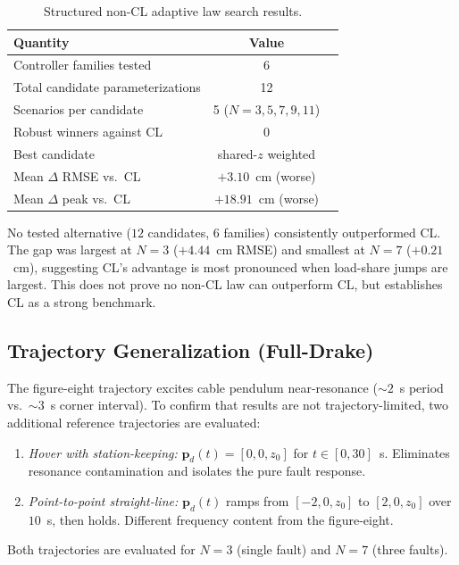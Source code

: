 \begin{table}[t]
\centering
\caption{Structured non-CL adaptive law search results.}
\label{tab:noncl_search}
\begin{tabular}{lcc}
\toprule
Quantity & Value \\
\midrule
Controller families tested       & 6 \\
Total candidate parameterizations & 12 \\
Scenarios per candidate          & 5 ($N = 3, 5, 7, 9, 11$) \\
Robust winners against CL        & 0 \\
\midrule
Best candidate                   & shared-$z$ weighted \\
Mean $\Delta$ RMSE vs.\ CL      & $+3.10$~cm (worse) \\
Mean $\Delta$ peak vs.\ CL      & $+18.91$~cm (worse) \\
\bottomrule
\end{tabular}
\end{table}

No tested alternative ($12$ candidates, $6$ families) consistently outperformed CL. The gap was largest at $N = 3$ ($+4.44$~cm RMSE) and smallest at $N = 7$ ($+0.21$~cm), suggesting CL's advantage is most pronounced when load-share jumps are largest. This does not prove no non-CL law can outperform CL, but establishes CL as a strong benchmark.

\subsection{Trajectory Generalization (Full-Drake)}
\label{supp:trajectory_generalization}

The figure-eight trajectory excites cable pendulum near-resonance (${\sim}2$~s period vs.\ ${\sim}3$~s corner interval). To confirm that results are not trajectory-limited, two additional reference trajectories are evaluated:
\begin{enumerate}[label=(\roman*),nosep]
  \item \emph{Hover with station-keeping:} $\bm{p}_d(t) = [0, 0, z_0]$ for $t \in [0, 30]$~s. Eliminates resonance contamination and isolates the pure fault response.
  \item \emph{Point-to-point straight-line:} $\bm{p}_d(t)$ ramps from $[-2, 0, z_0]$ to $[2, 0, z_0]$ over $10$~s, then holds. Different frequency content from the figure-eight.
\end{enumerate}
Both trajectories are evaluated for $N{=}3$ (single fault) and $N{=}7$ (three faults).

